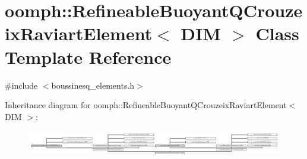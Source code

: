 \hypertarget{classoomph_1_1RefineableBuoyantQCrouzeixRaviartElement}{}\section{oomph\+:\+:Refineable\+Buoyant\+Q\+Crouzeix\+Raviart\+Element$<$ D\+IM $>$ Class Template Reference}
\label{classoomph_1_1RefineableBuoyantQCrouzeixRaviartElement}


{\ttfamily \#include $<$boussinesq\+\_\+elements.\+h$>$}

Inheritance diagram for oomph\+:\+:Refineable\+Buoyant\+Q\+Crouzeix\+Raviart\+Element$<$ D\+IM $>$\+:\begin{figure}[H]
\begin{center}
\leavevmode
\includegraphics[height=1.166667cm]{classoomph_1_1RefineableBuoyantQCrouzeixRaviartElement}
\end{center}
\end{figure}
